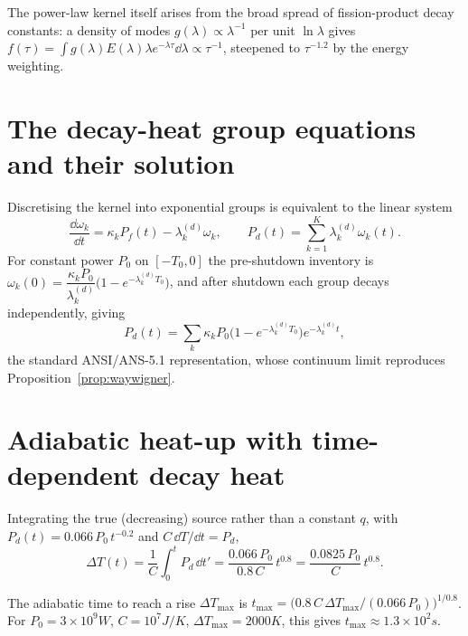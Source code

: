 The power-law kernel itself arises from the broad spread of fission-product decay
constants: a density of modes $g(\lambda)\propto\lambda^{-1}$ per unit
$\ln\lambda$ gives $f(\tau)=\int g(\lambda)E(\lambda)\lambda e^{-\lambda\tau}
\dd\lambda\propto\tau^{-1}$, steepened to $\tau^{-1.2}$ by the energy weighting.

\section{The decay-heat group equations and their solution}
\label{sec:decay-groups}

Discretising the kernel into exponential groups is equivalent to the linear system
\begin{equation}
\frac{\dd\omega_k}{\dd t}=\kappa_k P_f(t)-\lambda_k^{(d)}\omega_k,\qquad
P_d(t)=\sum_{k=1}^{K}\lambda_k^{(d)}\omega_k(t).
\end{equation}
For constant power $P_0$ on $[-T_0,0]$ the pre-shutdown inventory is
$\omega_k(0)=\dfrac{\kappa_k P_0}{\lambda_k^{(d)}}\big(1-e^{-\lambda_k^{(d)}T_0}\big)$,
and after shutdown each group decays independently, giving
\begin{equation}
P_d(t)=\sum_k \kappa_k P_0\big(1-e^{-\lambda_k^{(d)}T_0}\big)e^{-\lambda_k^{(d)}t},
\end{equation}
the standard ANSI/ANS-5.1 representation, whose continuum limit reproduces
Proposition~\ref{prop:waywigner}.

\section{Adiabatic heat-up with time-dependent decay heat}
\label{sec:decay-adiabatic}

Integrating the true (decreasing) source rather than a constant $q$, with
$P_d(t)=0.066\,P_0\,t^{-0.2}$ and $C\,\dd T/\dd t=P_d$,
\begin{equation}
\Delta T(t)=\frac1C\int_0^t P_d\,\dd t'
=\frac{0.066\,P_0}{0.8\,C}\,t^{0.8}=\frac{0.0825\,P_0}{C}\,t^{0.8}.
\label{eq:decay-heatup}
\end{equation}

\begin{corollary}
The adiabatic time to reach a rise $\Delta T_{\max}$ is
$t_{\max}=\big(0.8\,C\,\Delta T_{\max}/(0.066\,P_0)\big)^{1/0.8}$. For
$P_0=3\times10^{9}\unit{W}$, $C=10^{7}\unit{J/K}$, $\Delta T_{\max}=2000\unit{K}$,
this gives $t_{\max}\approx1.3\times10^{2}\unit{s}$.
\end{corollary}


